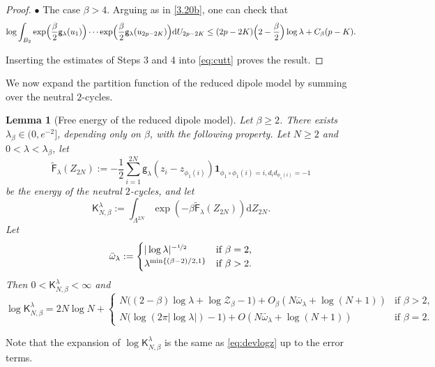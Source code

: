 \documentclass[a4paper,10pt,leqno]{amsart}
\numberwithin{equation}{section}
\newtheorem{lem}[prop]{Lemma}
\newcommand{\dd}{\mathrm{d}}
\def\mc{\mathcal}
\def\indic{\mathbf{1}}
\def\g{\mathsf{g}}
\def\F{\mathsf{F}}
\def\K{\mathsf{K}}
\begin{document}
\begin{proof}
  $\bullet$ The case $\beta>4$. Arguing as in \eqref{3.20b}, one can check that
  \begin{equation*}
    \log \int_{B_2}\exp\Bigl(\frac{\beta}{2}\g_\lambda(u_1)\Bigr)\cdots \exp\Bigl(\frac{\beta}{2}\g_\lambda(u_{2p-2K})\Bigr)\dd U_{2p-2K}\leq (2p-2K)\Bigl(2-\frac{\beta}{2}\Bigr)\log \lambda+C_\beta(p-K).
  \end{equation*}

  Inserting the estimates of Steps 3 and 4 into \eqref{eq:cutt} proves the result.

\end{proof}

We now expand the partition function of the reduced dipole model by summing over the neutral $2$-cycles.

\begin{lem}[Free energy of the reduced dipole model]\label{lemma:part nn}
  Let $\beta\ge2$. There exists $\lambda_\beta\in(0,e^{-2}]$, depending only on $\beta$, with the following property. Let $N\ge2$ and $0<\lambda<\lambda_\beta$, let
  \begin{equation*}
    \tilde{\F}_\lambda(Z_{2N}):= -\frac{1}{2}\sum_{i=1}^{2N} \g_\lambda(z_i-z_{\phi_1(i)}) \indic_{\phi_1\circ\phi_1(i)=i, d_i d_{\phi_1(i) }=-1}
  \end{equation*}
  be the energy of the neutral $2$-cycles, and let
  \begin{equation*}
    \K_{N,\beta}^\lambda:=\int_{\Lambda^{2N} } \exp(-\beta \tilde{\F}_\lambda(Z_{2N}))\dd Z_{2N}.
  \end{equation*}
  Let
  \begin{equation}\label{def:o nn}
    \bar \omega_\lambda:=\begin{cases}
      |\log\lambda|^{-\nicefrac{1}{2}} & \text{if $\beta=2$},\\
      \lambda^{\min\{(\beta-2)/2,1\}} & \text{if $\beta>2$}.
    \end{cases}
  \end{equation}
  Then $0<\K_{N,\beta}^\lambda<\infty$ and
  \[
    \log\K_{N,\beta}^\lambda=2N\log N+
    \begin{cases}
      N\bigl((2-\beta)\log\lambda+\log\mc Z_\beta-1\bigr)+O_\beta(N\bar\omega_\lambda+\log(N+1)) & \text{if $\beta>2$},\\
      N\bigl(\log(2\pi|\log\lambda|)-1\bigr)+O(N\bar\omega_\lambda+\log(N+1)) & \text{if $\beta=2$}.
    \end{cases}
  \]
\end{lem}
Note that the expansion of $\log \K_{N,\beta}^\lambda$ is the same as \eqref{eq:devlogz} up to the error terms.
\smallskip
\end{document}
